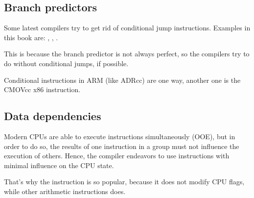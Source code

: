 ﻿

\subsection{Branch predictors}
\label{branch_predictors}

Some latest compilers try to get rid of conditional jump instructions.
Examples in this book are: , , .

This is because the branch predictor is not always perfect, so the compilers try to do 
without conditional jumps, if possible.

Conditional instructions in ARM (like ADRcc) are one way, another one is the CMOVcc x86 instruction.

\subsection{Data dependencies}

Modern CPUs are able to execute instructions simultaneously (\ac{OOE}), but in order to do so,
the results of one instruction in a group must not influence the execution of others.
Hence, the compiler endeavors to use instructions with minimal influence on the CPU state.

That's why the \LEA instruction is so popular, because it does not modify CPU flags, while
other arithmetic instructions does.
